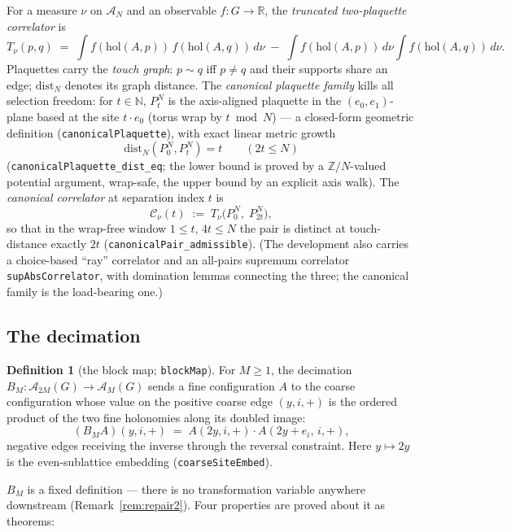 \documentclass[11pt]{article}
\theoremstyle{definition}
\newtheorem{definition}[theorem]{Definition}
\newcommand{\lean}[1]{\texttt{#1}}
\newcommand{\Conf}[1]{\mathcal{A}_{#1}}
\newcommand{\dist}{\mathrm{dist}}
\newcommand{\holo}{\mathrm{hol}}
\newcommand{\Cov}{\mathcal{C}}
\begin{document}
For a measure $\nu$ on $\Conf{N}$ and an observable
$f : G \to \mathbb{R}$, the \emph{truncated two-plaquette correlator}
is
\[
T_\nu(p, q) \;=\; \int f(\holo(A,p))\, f(\holo(A,q))\, d\nu
 \;-\; \int f(\holo(A,p))\, d\nu \int f(\holo(A,q))\, d\nu .
\]
Plaquettes carry the \emph{touch graph}: $p \sim q$ iff $p \ne q$ and
their supports share an edge; $\dist_N$ denotes its graph distance.
The \emph{canonical plaquette family} kills all selection freedom: for
$t \in \mathbb{N}$, $P^N_t$ is the axis-aligned plaquette in the
$(e_0, e_1)$-plane based at the site $t \cdot e_0$ (torus wrap by
$t \bmod N$) --- a closed-form geometric definition
(\lean{canonicalPlaquette}), with exact linear metric growth
\begin{equation}\label{eq:candist}
\dist_N(P^N_0, P^N_t) = t \qquad (2t \le N)
\end{equation}
(\lean{canonicalPlaquette\_dist\_eq}; the lower bound is proved by a
$\mathbb{Z}/N$-valued potential argument, wrap-safe, the upper bound
by an explicit axis walk).  The \emph{canonical correlator} at
separation index $t$ is
\[
\Cov_\nu(t) \;:=\; T_\nu\bigl(P^N_0,\; P^N_{2t}\bigr),
\]
so that in the wrap-free window $1 \le t$, $4t \le N$ the pair is
distinct at touch-distance exactly $2t$
(\lean{canonicalPair\_admissible}).  (The development also carries a
choice-based ``ray'' correlator and an all-pairs supremum correlator
\lean{supAbsCorrelator}, with domination lemmas connecting the three;
the canonical family is the load-bearing one.)

\subsection{The decimation}\label{sec:rg:blockmap}

\begin{definition}[the block map; \lean{blockMap}]\label{def:blockmap}
For $M \ge 1$, the decimation
$B_M : \Conf{2M}(G) \to \Conf{M}(G)$ sends a fine configuration $A$ to
the coarse configuration whose value on the positive coarse edge
$(y, i, +)$ is the ordered product of the two fine holonomies along
its doubled image:
\[
(B_M A)(y, i, +) \;=\; A(2y, i, +) \cdot A(2y + e_i,\, i, +),
\]
negative edges receiving the inverse through the reversal constraint.
Here $y \mapsto 2y$ is the even-sublattice embedding
(\lean{coarseSiteEmbed}).
\end{definition}

$B_M$ is a fixed definition --- there is no transformation variable
anywhere downstream (Remark~\ref{rem:repair2}).  Four properties are
proved about it as theorems:
\end{document}

